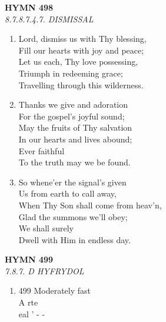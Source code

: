 \documentclass[11pt,a4paper]{article}
\begin{document}
\newpage
\begin{center}
    {\Large \textbf{HYMN 498}}
    \\
    \textit{8.7.8.7.4.7. DISMISSAL}
\end{center}
\vspace{1em}

\begin{enumerate}
    \item Lord, dismiss us with Thy blessing, \\
        Fill our hearts with joy and peace; \\
        Let us each, Thy love possessing, \\
        Triumph in redeeming grace; \\
        Travelling through this wilderness.

    \item Thanks we give and adoration \\
        For the gospel's joyful sound; \\
        May the fruits of Thy salvation \\
        In our hearts and lives abound; \\
        Ever faithful \\
        To the truth may we be found.

    \item So whene'er the signal's given \\
        Us from earth to call away, \\
        When Thy Son shall come from heav'n, \\
        Glad the summons we'll obey; \\
        We shall surely \\
        Dwell with Him in endless day.

\end{enumerate}

\newpage
\begin{center}
    {\Large \textbf{HYMN 499}}
    \\
    \textit{7.8.7. D HYFRYDOL}
\end{center}
\vspace{1em}

\begin{enumerate}
    \item 499 Moderately fast \\
        A rte \\
        eal ' - -

\end{enumerate}
\end{document}
